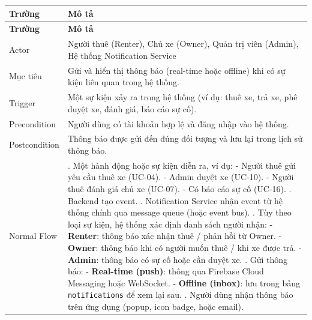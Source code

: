 \begin{longtable}{|>{\raggedright\arraybackslash}p{4cm}|>{\raggedright\arraybackslash}p{11cm}|}
\hline
\textbf{Trường} & \textbf{Mô tả} \\
\hline
\endfirsthead

\hline
\textbf{Trường} & \textbf{Mô tả} \\
\hline
\endhead

\hline
\endfoot

Actor & Người thuê (Renter), Chủ xe (Owner), Quản trị viên (Admin), Hệ thống Notification Service \\
\hline
Mục tiêu & Gửi và hiển thị thông báo (real-time hoặc offline) khi có sự kiện liên quan trong hệ thống. \\
\hline
Trigger & Một sự kiện xảy ra trong hệ thống (ví dụ: thuê xe, trả xe, phê duyệt xe, đánh giá, báo cáo sự cố). \\
\hline
Precondition & Người dùng có tài khoản hợp lệ và đăng nhập vào hệ thống. \\
\hline
Postcondition & Thông báo được gửi đến đúng đối tượng và lưu lại trong lịch sử thông báo. \\
\hline
Normal Flow & 1. Một hành động hoặc sự kiện diễn ra, ví dụ: \newline - Người thuê gửi yêu cầu thuê xe (UC-04). \newline - Admin duyệt xe (UC-10). \newline - Người thuê đánh giá chủ xe (UC-07). \newline - Có báo cáo sự cố (UC-16). \newline 2. Backend tạo event. \newline 3. Notification Service nhận event từ hệ thống chính qua message queue (hoặc event bus). \newline 4. Tùy theo loại sự kiện, hệ thống xác định danh sách người nhận: \newline - \textbf{Renter}: thông báo xác nhận thuê / phản hồi từ Owner. \newline - \textbf{Owner}: thông báo khi có người muốn thuê / khi xe được trả. \newline - \textbf{Admin}: thông báo có sự cố hoặc cần duyệt xe. \newline 5. Gửi thông báo: \newline - \textbf{Real-time (push)}: thông qua Firebase Cloud Messaging hoặc WebSocket. \newline - \textbf{Offline (inbox)}: lưu trong bảng \texttt{notifications} để xem lại sau. \newline 6. Người dùng nhận thông báo trên ứng dụng (popup, icon badge, hoặc email). \\

\end{longtable}
